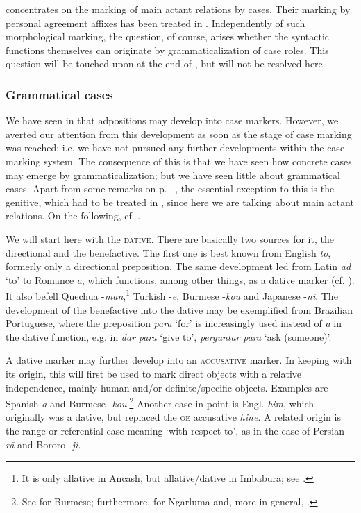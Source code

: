  concentrates on the marking of main actant relations by cases. Their marking by personal agreement affixes has been treated in . Independently of such morphological marking, the question, of course, arises whether the syntactic functions themselves can originate by grammaticalization of case roles. This question will be touched upon at the end of , but will not be resolved here.

\subsubsection{Grammatical cases} \label{sec:3.4.2.2}
We have seen in  that adpositions may develop into case markers. However, we averted our attention from this development as soon as the stage of case marking was reached; i.e. we have not pursued any further developments within the case marking system. The consequence of this is that we have seen how concrete cases may emerge by grammaticalization; but we have seen little about grammatical cases. Apart from some remarks on p.~\pageref{page88}\chk%
 , the essential exception to this is the genitive, which had to be treated in , since here we are talking about main actant relations. On the following, cf. \citet[218]{Givón1979a}.

We will start here with the \textsc{dative}. There are basically two sources for it, the directional and the benefactive. The first one is best known from English \textit{to}, formerly only a directional preposition. The same development led from Latin \textit{ad} ‘to’ to Romance \textit{a}, which functions, among other things, as a dative marker (cf. ). It also befell Quechua -\textit{man},\footnote{It is only allative in Ancash, but allative/dative in Imbabura; see \citet[104]{Cole1982}.} Turkish -\textit{e}, Burmese -\textit{kou} and Japanese -\textit{ni}. The development of the benefactive into the dative may be exemplified from Brazilian Portuguese, where the preposition \textit{para} ‘for’ is increasingly used instead of \textit{a} in the dative function, e.g. in \textit{dar} \textit{para} ‘give to’, \textit{perguntar} \textit{para} ‘ask (someone)’.

A dative marker may further develop into an \textsc{accusative} marker. In keeping with its origin, this will first be used to mark direct objects with a relative independence, mainly human and/or definite/specific objects. Examples are Spanish \textit{a} and Burmese -\textit{kou}.\footnote{See \citet{Kölver1985} for Burmese; furthermore, \citet[99]{Dixon1979} for Ngarluma and, more in general, \citet[48f, 166]{MallinsonEtAl1981}.} Another case in point is Engl. \textit{him}, which originally was a dative, but replaced the \textsc{oe} accusative \textit{hine}. A related origin is the range or referential case meaning ‘with respect to’, as in the case of  Persian -\textit{r\=a} and Bororo \textit{{}-ji}.

